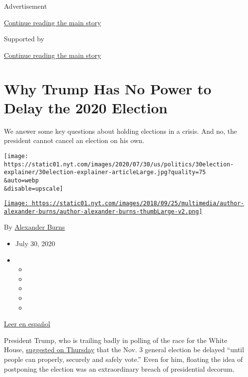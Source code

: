 Advertisement

\protect\hyperlink{after-top}{Continue reading the main story}

Supported by

\protect\hyperlink{after-sponsor}{Continue reading the main story}

\hypertarget{why-trump-has-no-power-to-delay-the-2020-election}{%
\section{Why Trump Has No Power to Delay the 2020
Election}\label{why-trump-has-no-power-to-delay-the-2020-election}}

We answer some key questions about holding elections in a crisis. And
no, the president cannot cancel an election on his own.

\texttt{[image: https://static01.nyt.com/images/2020/07/30/us/politics/30election-explainer/30election-explainer-articleLarge.jpg?quality=75\\\&auto=webp\\\&disable=upscale]}

\href{https://www.nytimes.com/by/alexander-burns}{\texttt{[image: https://static01.nyt.com/images/2018/09/25/multimedia/author-alexander-burns/author-alexander-burns-thumbLarge-v2.png]}}

By \href{https://www.nytimes.com/by/alexander-burns}{Alexander Burns}

\begin{itemize}
\item
  July 30, 2020
\item
  \begin{itemize}
  \item
  \item
  \item
  \item
  \item
  \end{itemize}
\end{itemize}

\href{https://www.nytimes.com/es/2020/07/30/espanol/estados-unidos/trump-retrasar-elecciones.html}{Leer
en español}

President Trump, who is trailing badly in polling of the race for the
White House,
\href{https://www.nytimes.com/2020/07/30/us/elections/biden-vs-trump.html}{suggested
on Thursday} that the Nov. 3 general election be delayed ``until people
can properly, securely and safely vote.'' Even for him, floating the
idea of postponing the election was an extraordinary breach of
presidential decorum.

